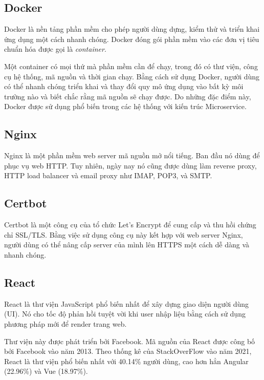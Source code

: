 \documentclass[./../main.tex]{subfiles}
\begin{document}
\hypertarget{docker}{%
\subsection{Docker}\label{docker}}

Docker là nền tảng phần mềm cho phép người dùng dựng, kiểm thử và triển
khai ứng dụng một cách nhanh chóng. Docker đóng gói phần mềm vào các đơn
vị tiêu chuẩn hóa được gọi là \emph{container}.

Một container có mọi thứ mà phần mềm cần để chạy, trong đó có thư viện,
công cụ hệ thống, mã nguồn và thời gian chạy. Bằng cách sử dụng Docker,
người dùng có thể nhanh chóng triển khai và thay đổi quy mô ứng dụng vào
bất kỳ môi trường nào và biết chắc rằng mã nguồn sẽ chạy được. Do những
đặc điểm này, Docker được sử dụng phổ biến trong các hệ thống với kiến
trúc Microservice.

\hypertarget{nginx}{%
\subsection{Nginx}\label{nginx}}

Nginx là một phần mềm web server mã nguồn mở nổi tiếng. Ban đầu nó dùng
để phục vụ web HTTP. Tuy nhiên, ngày nay nó cũng được dùng làm reverse
proxy, HTTP load balancer và email proxy như IMAP, POP3, và SMTP.

\hypertarget{certbot}{%
\subsection{Certbot}\label{certbot}}

Certbot là một công cụ của tổ chức Let's Encrypt để cung cấp và thu hồi
chứng chỉ SSL/TLS. Bằng việc sử dụng công cụ này kết hợp với web server
Nginx, người dùng có thể nâng cấp server của mình lên HTTPS một cách dễ
dàng và nhanh chóng.

\hypertarget{react}{%
\subsection{React}\label{react}}

React là thư viện JavaScript phổ biến nhất để xây dựng giao diện người
dùng (UI). Nó cho tốc độ phản hồi tuyệt vời khi user nhập liệu bằng cách
sử dụng phương pháp mới để render trang web.

Thư viện này được phát triển bởi Facebook. Mã nguồn của React được công
bố bởi Facebook vào năm 2013. Theo thống kê của StackOverFlow vào năm
2021, React là thư viện phổ biến nhất với 40.14\% người dùng, cao hơn
hẳn Angular (22.96\%) và Vue (18.97\%).
\end{document}
